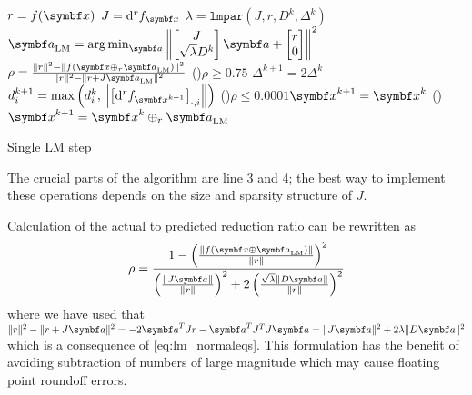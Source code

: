 \begin{algorithm}
  \DontPrintSemicolon

  $r = f(\x)$\;
  $J = \mathrm{d}^r f_\x$\;
  $\lambda = \mathtt{lmpar}(J, r, D^k, \Delta^{k})$ 
  $\a_\mathrm{LM} = \argmin_{\a} \left\| \begin{bmatrix} J \\ \sqrt{\lambda} D^k \end{bmatrix} \a + \begin{bmatrix} r \\ 0 \end{bmatrix} \right\|^2$ 
  $\rho = \frac{ \| r \|^2 - \| f(\x \oplus_r \a_\mathrm{LM}) \|^2 }{\| r \|^2 - \| r + J \a_\mathrm{LM} \|^2}$ 
  \ElseIf(){$\rho \geq 0.75$}{
    $\Delta^{k+1} = 2 \Delta^{k}$ 
  }
  $d_i^{k+1} = \max \left(d_i^k, \left\| \left[ \mathrm{d}^r f_{\x^{k+1}} \right]_{\cdot, i} \right\| \right)$ 
  \lIf(){$\rho \leq 0.0001$}{$\x^{k+1} = \x^k$}
  \lElse(){ $\x^{k+1} = \x^k \oplus_r \a_\mathrm{LM}$}

  \caption{Single LM step}
  \label{algo:lm}
\end{algorithm}

The crucial parts of the algorithm are line 3 and 4; the best way to implement these operations depends on the size and sparsity structure of $J$.

Calculation of the actual to predicted reduction ratio can be rewritten as
\begin{equation}
  \rho = \frac{1 - \left( \frac{ \| f(\x \oplus \a_\mathrm{LM}) \|}{\|r\|} \right)^2 }{\left( \frac{\| J \a \|}{\| r \|} \right)^2 + 2 \left( \frac{\sqrt{\lambda} \| D \a \|}{\| r \|} \right)^2}
\end{equation}
where we have used that $\| r \|^2 - \| r + J \a \|^2 = -2 \a^T J r - \a^T J^T J \a = \| J \a \|^2 + 2 \lambda \| D \a \|^2$ which is a consequence of \eqref{eq:lm_normaleqs}. This formulation has the benefit of avoiding subtraction of numbers of large magnitude which may cause floating point roundoff errors.


